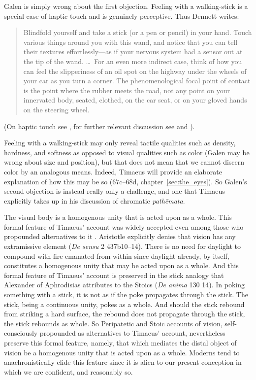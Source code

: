 Galen is simply wrong about the first objection. Feeling with a walking-stick is a special case of haptic touch and is genuinely perceptive. Thus Dennett writes:
\begin{quote}
	Blindfold yourself and take a stick (or a pen or pencil) in your hand. Touch various things around you with this wand, and notice that you can tell their textures effortlessly---as if your nervous system had a sensor out at the tip of the wand. \ldots\ For an even more indirect case, think of how you can feel the slipperiness of an oil spot on the highway under the wheels of your car as you turn a corner. The phenomenological focal point of contact is the point where the rubber meets the road, not any point on your innervated body, seated, clothed, on the car seat, or on your gloved hands on the steering wheel. \citep[47]{Dennett:1993ce}
\end{quote}
(On haptic touch see \citealt{Lederman:1987fr}, for further relevant discussion see \citealt{Fulkerson:2014ek} and \citealt[chapters 1--2]{Kalderon:2018oe}). 

Feeling with a walking-stick may only reveal tactile qualities such as density, hardness, and softness as opposed to visual qualities such as color (Galen may be wrong about size and position), but that does not mean that we cannot discern color by an analogous means. Indeed, Timaeus will provide an elaborate explanation of how this may be so (67c–68d, chapter~\ref{sec:the_eyes}). So Galen's second objection is instead really only a challenge, and one that Timaeus explicitly takes up in his discussion of chromatic \emph{pathēmata}.

The visual body is a homogenous unity that is acted upon as a whole. This formal feature of Timaeus' account was widely accepted even among those who propounded alternatives to it \cite[chapter 1]{Lindberg:1977aa}. Aristotle explicitly denies that vision has any extramissive element (\emph{De sensu} 2 437b10--14). There is no need for daylight to compound with fire emanated from within since daylight already, by itself, constitutes a homogenous unity that may be acted upon as a whole. And this formal feature of Timaeus' account is preserved in the stick analogy that Alexander of Aphrodisias attributes to the Stoics (\emph{De anima} 130 14). In poking something with a stick, it is not as if the poke propagates through the stick. The stick, being a continuous unity, pokes as a whole. And should the stick rebound from striking a hard surface, the rebound does not propagate through the stick, the stick rebounds as whole. So Peripatetic and Stoic accounts of vision, self-consciously propounded as alternatives to Timaeus' account, nevertheless preserve this formal feature, namely, that which mediates the distal object of vision be a homogenous unity that is acted upon as a whole. Moderns tend to anachronistically elide this feature since it is alien to our present conception in which we are confident, and reasonably so.

